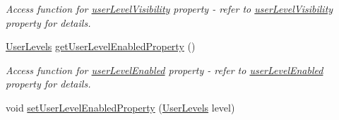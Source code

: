 \begin{DoxyCompactItemize}
\begin{DoxyCompactList}\small\item\em Access function for \hyperlink{classQEGenericEdit_a7f0733266f39549d361cdf65e34ebd30}{userLevelVisibility} property -\/ refer to \hyperlink{classQEGenericEdit_a7f0733266f39549d361cdf65e34ebd30}{userLevelVisibility} property for details. \end{DoxyCompactList}\item 
\hypertarget{classQEGenericEdit_a68003d4b2c5ff1c6bea247a63a3de9fd}{
\hyperlink{classQEGenericEdit_a0d4ee4dc910113b53e1396e0736f28b7}{UserLevels} \hyperlink{classQEGenericEdit_a68003d4b2c5ff1c6bea247a63a3de9fd}{getUserLevelEnabledProperty} ()}
\label{classQEGenericEdit_a68003d4b2c5ff1c6bea247a63a3de9fd}

\begin{DoxyCompactList}\small\item\em Access function for \hyperlink{classQEGenericEdit_ae18520d83fec62603db7e658efe00e3c}{userLevelEnabled} property -\/ refer to \hyperlink{classQEGenericEdit_ae18520d83fec62603db7e658efe00e3c}{userLevelEnabled} property for details. \end{DoxyCompactList}\item 
\hypertarget{classQEGenericEdit_a5b2ed96d60d2e12262a4e27a62036e11}{
void \hyperlink{classQEGenericEdit_a5b2ed96d60d2e12262a4e27a62036e11}{setUserLevelEnabledProperty} (\hyperlink{classQEGenericEdit_a0d4ee4dc910113b53e1396e0736f28b7}{UserLevels} level)}
\label{classQEGenericEdit_a5b2ed96d60d2e12262a4e27a62036e11}


\end{DoxyCompactItemize}
